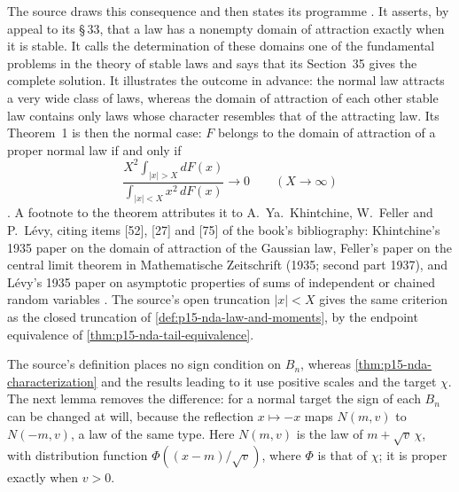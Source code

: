 The source draws this consequence and then states its programme
\cite[p.~172]{GnedenkoKolmogorov1954LimitDistributions}. It asserts,
by appeal to its \S\,33, that a law has a nonempty domain of
attraction exactly when it is stable. It calls the determination of these
domains one of the fundamental problems in the theory of stable laws
and says that its Section~35 gives the complete solution. It
illustrates the outcome in advance: the normal law attracts a very
wide class of laws, whereas the domain of attraction of each other
stable law contains only laws whose character resembles that of the
attracting law. Its Theorem~1 is then the normal case: \(F\) belongs
to the domain of attraction of a proper normal law if and only if
\[
 \frac{X^2\int_{|x|>X}dF(x)}{\int_{|x|<X}x^2\,dF(x)}\to0
 \qquad(X\to\infty)
\]
\cite[Section~35, Theorem~1, p.~172]{GnedenkoKolmogorov1954LimitDistributions}.
A footnote to the theorem attributes it to A.~Ya.~Khintchine, W.~Feller
and P.~L\'evy, citing items [52], [27] and [75] of the book's
bibliography: Khintchine's 1935 paper on the domain of attraction of
the Gaussian law, Feller's paper on the central limit theorem in
Mathematische Zeitschrift (1935; second part 1937), and L\'evy's 1935
paper on asymptotic properties of sums of independent or chained
random variables
\cite[p.~172, footnote; Bibliography, pp.~258--260]{GnedenkoKolmogorov1954LimitDistributions}.
The source's open truncation \(|x|<X\) gives the same criterion as
the closed truncation of \cref{def:p15-nda-law-and-moments}, by the
endpoint equivalence of \cref{thm:p15-nda-tail-equivalence}.

The source's definition places no sign condition on \(B_n\), whereas
\cref{thm:p15-nda-characterization} and the results leading to it use
positive scales and the target \(\chi\). The next lemma removes the
difference: for a normal target the sign of each \(B_n\) can be
changed at will, because the reflection \(x\mapsto-x\) maps
\(N(m,v)\) to \(N(-m,v)\), a law of the same type.
Here \(N(m,v)\) is the law of \(m+\sqrt v\,\chi\), with distribution
function \(\Phi((x-m)/\sqrt v)\), where \(\Phi\) is that of \(\chi\);
it is proper exactly when \(v>0\).


